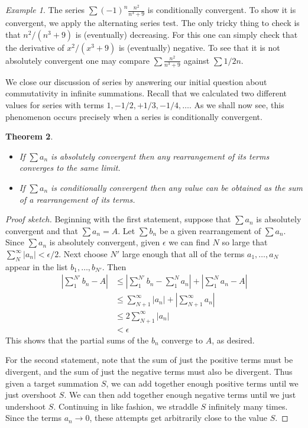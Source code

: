 \documentclass[11pt,oneside]{amsbook}
\theoremstyle{definition}
\theoremstyle{plain}
\newtheorem{theorem}{Theorem}[section]
\theoremstyle{definition}
\theoremstyle{remark}
\newtheorem{example}[theorem]{Example}
\numberwithin{equation}{section}
\numberwithin{figure}{section}
\begin{document}
\begin{example}
  The series $\sum(-1)^n\frac{n^2}{n^3+9}$ is conditionally convergent. To show it is convergent, we apply the alternating series test. The only tricky thing to check is that $n^2/(n^3+9)$ is (eventually) decreasing. For this one can simply check that the derivative of $x^2/(x^3+9)$ is (eventually) negative. To see that it is not absolutely convergent one may compare $\sum\frac{n^2}{n^3+9}$ against $\sum 1/2n$. 
\end{example}

We close our discussion of series by answering our initial question about commutativity in infinite summations. Recall that we calculated two different values for series with terms $1,-1/2,+1/3,-1/4,\ldots$. As we shall now see, this phenomenon occurs precisely when a series is conditionally convergent.

\begin{theorem}
  \begin{itemize}
  \item If $\sum a_n$ is absolutely convergent then any rearrangement of its terms converges to the same limit.
  \item If $\sum a_n$ is conditionally convergent then any value can be obtained as the sum of a rearrangement of its terms.
  \end{itemize}
\end{theorem}

\begin{proof}[Proof sketch]
  Beginning with the first statement, suppose that $\sum a_n$ is absolutely convergent and that $\sum a_n=A$. Let $\sum b_n$ be a given rearrangement of $\sum a_n$. Since $\sum a_n$ is absolutely convergent, given $\epsilon$ we can find $N$ so large that $\sum_N^\infty|a_n|<\epsilon/2$. Next choose $N'$ large enough that all of the terms $a_1,\ldots,a_N$ appear in the list $b_1,\ldots,b_{N'}$. Then
  \begin{align*}
    \left|\sum_1^{N'}b_n-A\right|
    &\leq\left|\sum_1^{N'}b_n-\sum_1^Na_n\right|+\left|\sum_1^Na_n-A\right|\\
    &\leq\sum_{N+1}^\infty|a_n|+\left|\sum_{N+1}^\infty a_n\right|\\
    &\leq2\sum_{N+1}^\infty|a_n|\\
    &<\epsilon
  \end{align*}
  This shows that the partial sums of the $b_n$ converge to $A$, as desired.
  
  For the second statement, note that the sum of just the positive terms must be divergent, and the sum of just the negative terms must also be divergent. Thus given a target summation $S$, we can add together enough positive terms until we just overshoot $S$. We can then add together enough negative terms until we just undershoot $S$. Continuing in like fashion, we straddle $S$ infinitely many times. Since the terms $a_n\to0$, these attempts get arbitrarily close to the value $S$.
\end{proof}
\end{document}
